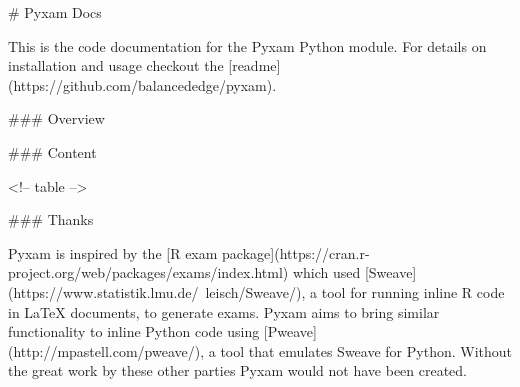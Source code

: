 # Pyxam Docs

This is the code documentation for the Pyxam Python module. For details on installation and usage checkout the [readme](https://github.com/balancededge/pyxam).

### Overview



### Content

<!-- table -->



### Thanks

Pyxam is inspired by the [R exam package](https://cran.r-project.org/web/packages/exams/index.html) which used [Sweave](https://www.statistik.lmu.de/~leisch/Sweave/), a tool for running inline R code in LaTeX documents, to generate exams. Pyxam aims to bring similar functionality to inline Python code using [Pweave](http://mpastell.com/pweave/), a tool that emulates Sweave for Python. Without the great work by these other parties Pyxam would not have been created.

